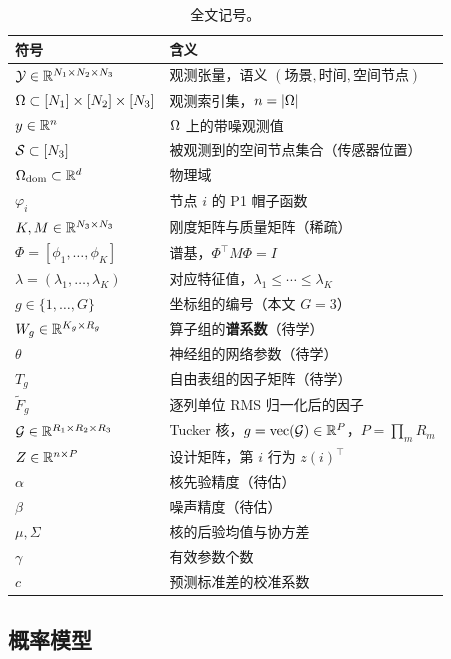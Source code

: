 \documentclass[11pt,a4paper]{article}
\begin{document}
\begin{table}[htbp]\centering\small
\caption{全文记号。}
\begin{tabular}{@{}ll@{}}
\toprule
符号 & 含义\\
\midrule
$\mathcal{Y}\in\mathbb{R}^{N_1\times N_2\times N_3}$ & 观测张量，语义 $(\text{场景},\text{时间},\text{空间节点})$\\
$\Omega\subset[N_1]\times[N_2]\times[N_3]$ & 观测索引集，$n=|\Omega|$\\
$y\in\mathbb{R}^{n}$ & $\Omega$ 上的带噪观测值\\
$\mathcal{S}\subset[N_3]$ & 被观测到的空间节点集合（传感器位置）\\
\midrule
$\Omega_{\mathrm{dom}}\subset\mathbb{R}^{d}$ & 物理域\\
$\varphi_i$ & 节点 $i$ 的 P1 帽子函数\\
$K,M\in\mathbb{R}^{N_3\times N_3}$ & 刚度矩阵与质量矩阵（稀疏）\\
$\Phi=[\phi_1,\dots,\phi_K]$ & 谱基，$\Phi^\top M\Phi=I$\\
$\lambda=(\lambda_1,\dots,\lambda_K)$ & 对应特征值，$\lambda_1\le\cdots\le\lambda_K$\\
\midrule
$g\in\{1,\dots,G\}$ & 坐标组的编号（本文 $G=3$）\\
$W_g\in\mathbb{R}^{K_g\times R_g}$ & 算子组的\textbf{谱系数}（待学）\\
$\theta$ & 神经组的网络参数（待学）\\
$T_g$ & 自由表组的因子矩阵（待学）\\
$\tilde F_g$ & 逐列单位 RMS 归一化后的因子\\
$\mathcal{G}\in\mathbb{R}^{R_1\times R_2\times R_3}$ & Tucker 核，$g=\mathrm{vec}(\mathcal{G})\in\mathbb{R}^{P}$，$P=\prod_mR_m$\\
$Z\in\mathbb{R}^{n\times P}$ & 设计矩阵，第 $i$ 行为 $z(i)^\top$\\
\midrule
$\alpha$ & 核先验精度（待估）\\
$\beta$ & 噪声精度（待估）\\
$\mu,\Sigma$ & 核的后验均值与协方差\\
$\gamma$ & 有效参数个数\\
$c$ & 预测标准差的校准系数\\
\bottomrule
\end{tabular}
\end{table}

\subsection{概率模型}
\label{sec:model}
\end{document}
